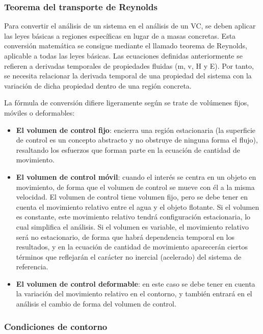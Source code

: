 \subsubsection{Teorema del transporte de
Reynolds}\label{header-n347}

Para convertir el análisis de un sistema en el análisis de un VC, se
deben aplicar las leyes básicas a regiones específicas en lugar de a
masas concretas. Esta conversión matemática se consigue mediante el
llamado teorema de Reynolds, aplicable a todas las leyes básicas. Las
ecuaciones definidas anteriormente se
refieren a derivadas temporales de propiedades fluidas (m, v, H y E).
Por tanto, se necesita relacionar la derivada temporal de una propiedad
del sistema con la variación de dicha propiedad dentro de una región
concreta.

La fórmula de conversión difiere ligeramente según se trate de volúmenes
fijos, móviles o deformables:

\begin{itemize}
\item
  \textbf{El volumen de control fijo}: encierra una región estacionaria
  (la superficie de control es un concepto abstracto y no obstruye de
  ninguna forma el flujo), resaltando los esfuerzos que forman parte en
  la ecuación de cantidad de movimiento.
\item
  \textbf{El volumen de control móvil}: cuando el interés se centra en
  un objeto en movimiento, de forma que el volumen de control se mueve
  con él a la misma velocidad. El volumen de control tiene volumen fijo,
  pero se debe tener en cuenta el movimiento relativo entre el agua y el
  objeto flotante. Si el volumen es constante, este movimiento relativo
  tendrá configuración estacionaria, lo cual simplifica el análisis. Si
  el volumen es variable, el movimiento relativo será no estacionario,
  de forma que habrá dependencia temporal en los resultados, y en la
  ecuación de cantidad de movimiento aparecerán ciertos términos que
  reflejarán el carácter no inercial (acelerado) del sistema de
  referencia.
\item
  \textbf{El volumen de control deformable}: en este caso se debe tener
  en cuenta la variación del movimiento relativo en el contorno, y
  también entrará en el análisis el cambio de forma del volumen de
  control.
\end{itemize}

\subsubsection{Condiciones de contorno}\label{header-n365}

